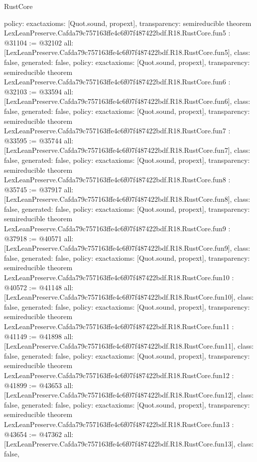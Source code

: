 \begin{lexlean}{RustCore}
\begin{coremodule}
{  policy: exact{axioms: [Quot.sound, propext]},
  transparency: semireducible
}
theorem LexLeanPreserve.Cafda79c757163ffe4c6f07f487422bdf.R18.RustCore.fun5 : @31104 := @32102 {
  all: [LexLeanPreserve.Cafda79c757163ffe4c6f07f487422bdf.R18.RustCore.fun5],
  class: false,
  generated: false,
  policy: exact{axioms: [Quot.sound, propext]},
  transparency: semireducible
}
theorem LexLeanPreserve.Cafda79c757163ffe4c6f07f487422bdf.R18.RustCore.fun6 : @32103 := @33594 {
  all: [LexLeanPreserve.Cafda79c757163ffe4c6f07f487422bdf.R18.RustCore.fun6],
  class: false,
  generated: false,
  policy: exact{axioms: [Quot.sound, propext]},
  transparency: semireducible
}
theorem LexLeanPreserve.Cafda79c757163ffe4c6f07f487422bdf.R18.RustCore.fun7 : @33595 := @35744 {
  all: [LexLeanPreserve.Cafda79c757163ffe4c6f07f487422bdf.R18.RustCore.fun7],
  class: false,
  generated: false,
  policy: exact{axioms: [Quot.sound, propext]},
  transparency: semireducible
}
theorem LexLeanPreserve.Cafda79c757163ffe4c6f07f487422bdf.R18.RustCore.fun8 : @35745 := @37917 {
  all: [LexLeanPreserve.Cafda79c757163ffe4c6f07f487422bdf.R18.RustCore.fun8],
  class: false,
  generated: false,
  policy: exact{axioms: [Quot.sound, propext]},
  transparency: semireducible
}
theorem LexLeanPreserve.Cafda79c757163ffe4c6f07f487422bdf.R18.RustCore.fun9 : @37918 := @40571 {
  all: [LexLeanPreserve.Cafda79c757163ffe4c6f07f487422bdf.R18.RustCore.fun9],
  class: false,
  generated: false,
  policy: exact{axioms: [Quot.sound, propext]},
  transparency: semireducible
}
theorem LexLeanPreserve.Cafda79c757163ffe4c6f07f487422bdf.R18.RustCore.fun10 : @40572 := @41148 {
  all: [LexLeanPreserve.Cafda79c757163ffe4c6f07f487422bdf.R18.RustCore.fun10],
  class: false,
  generated: false,
  policy: exact{axioms: [Quot.sound, propext]},
  transparency: semireducible
}
theorem LexLeanPreserve.Cafda79c757163ffe4c6f07f487422bdf.R18.RustCore.fun11 : @41149 := @41898 {
  all: [LexLeanPreserve.Cafda79c757163ffe4c6f07f487422bdf.R18.RustCore.fun11],
  class: false,
  generated: false,
  policy: exact{axioms: [Quot.sound, propext]},
  transparency: semireducible
}
theorem LexLeanPreserve.Cafda79c757163ffe4c6f07f487422bdf.R18.RustCore.fun12 : @41899 := @43653 {
  all: [LexLeanPreserve.Cafda79c757163ffe4c6f07f487422bdf.R18.RustCore.fun12],
  class: false,
  generated: false,
  policy: exact{axioms: [Quot.sound, propext]},
  transparency: semireducible
}
theorem LexLeanPreserve.Cafda79c757163ffe4c6f07f487422bdf.R18.RustCore.fun13 : @43654 := @47362 {
  all: [LexLeanPreserve.Cafda79c757163ffe4c6f07f487422bdf.R18.RustCore.fun13],
  class: false,
}
\end{coremodule}
\end{lexlean}
